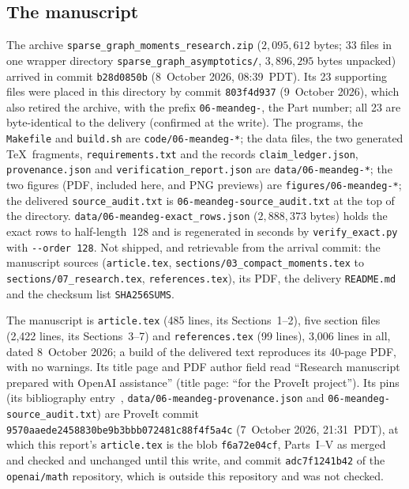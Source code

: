 \documentclass[11pt,letterpaper]{article}
\theoremstyle{remark}\newtheorem{remark}[theorem]{Remark}
\newcommand{\file}[1]{\nolinkurl{#1}}
\theoremstyle{definition}\newtheorem{definition}[theorem]{Definition}
\begin{document}
\subsection{The manuscript}\label{sgm:md:sec:provenance}

The archive \file{sparse_graph_moments_research.zip} ($2{,}095{,}612$ bytes;
33 files in one wrapper directory \file{sparse_graph_asymptotics/},
$3{,}896{,}295$ bytes unpacked) arrived in commit \file{b28d0850b}
(8~October 2026, 08:39~PDT). Its 23 supporting files were placed in this
directory by commit \file{803f4d937} (9~October 2026), which also retired the
archive, with the prefix \file{06-meandeg-}, the Part number; all 23 are
byte-identical to the delivery (confirmed at the write). The programs, the
\file{Makefile} and \file{build.sh} are \file{code/06-meandeg-*}; the data
files, the two generated \TeX\ fragments, \file{requirements.txt} and the
records \file{claim_ledger.json}, \file{provenance.json} and
\file{verification_report.json} are \file{data/06-meandeg-*}; the two
figures (PDF, included here, and PNG previews) are \file{figures/06-meandeg-*};
the delivered \file{source_audit.txt} is \file{06-meandeg-source_audit.txt} at
the top of the directory. \file{data/06-meandeg-exact_rows.json}
($2{,}888{,}373$ bytes) holds the exact rows to half-length~128 and is
regenerated in seconds by \file{verify_exact.py} with \texttt{-{}-order 128}. Not shipped,
and retrievable from the arrival commit: the manuscript sources
(\file{article.tex}, \file{sections/03_compact_moments.tex} to
\file{sections/07_research.tex}, \file{references.tex}), its PDF, the
delivery \file{README.md} and the checksum list \file{SHA256SUMS}.

The manuscript is \file{article.tex} (485 lines, its Sections~1--2), five
section files (2{,}422 lines, its Sections~3--7) and \file{references.tex}
(99 lines), 3{,}006 lines in all, dated 8~October 2026; a build of the
delivered text reproduces its 40-page PDF, with no warnings. Its title page
and PDF author field read ``Research manuscript prepared with OpenAI
assistance'' (title page: ``for the ProveIt project''). Its pins (its
bibliography entry~\cite{ProveIt2026}, \file{data/06-meandeg-provenance.json}
and \file{06-meandeg-source_audit.txt}) are ProveIt commit
\file{9570aaede2458830be9b3bbb072481c88f4f5a4c} (7~October 2026, 21:31~PDT),
at which this report's \file{article.tex} is the blob \file{f6a72e04cf},
Parts~I--V as merged and checked and unchanged until this write, and commit
\file{adc7f1241b42} of the \texttt{openai/math} repository, which is outside
this repository and was not checked.
\end{document}
